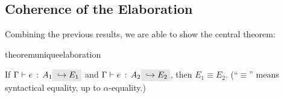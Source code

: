 \begin{comment}
Note that $A$ \emph{exclusive} or $B$ is true if and only if their truth value
differ. Next, we are going to investigate the minimal requirement (necessary and
sufficient conditions) such that the theorem holds.

If $A_1$ and $A_2$ in this setting are the same, for example,
$\tyint \inter \tyint \subtype \tyint$, obviously the theorem will
not hold since both the left $\tyint$ and the right $\tyint$ are a
subtype of $\tyint$.

We can try to rule out such possibilities by making the requirement of
well-formedness stronger. This suggests that the two types on the sides of
$\inter$ should not ``overlap''. In other words, they should be ``disjoint''. It
is easy to determine if two base types are disjoint. For example, $\tyint$
and $\tyint$ are not disjoint. Neither do $\tyint$ and $\code{Nat}$.
Also, types built with different constructors are disjoint. For example,
$\tyint$ and $\tyint \to \tyint$. For function types, disjointness
is harder to visualize. But bear in the mind that disjointness can defined by
the very requirement that the theorem holds.


This result is captured more formally by the following lemma:
\end{comment}




\subsection{Coherence of the Elaboration}
Combining the previous results, we are able to show the central theorem:

\begin{restatable}{theorem}{uniqueelaboration}
  \label{theorem:unique-elaboration}

  If $\jtype \Gamma e {A_1} \yields {E_1}$ and $\jtype \Gamma e {A_2} \yields
  {E_2}$, then $E_1 \equiv E_2$. (``$\equiv$'' means syntactical equality, up to
  $\alpha$-equality.)

\end{restatable}

